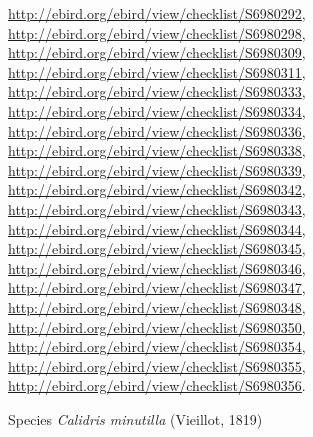 \documentclass[9pt, article]{memoir}
\begin{document}
\begin{multicols}{2}
\url{http://ebird.org/ebird/view/checklist/S6980292}, 
\url{http://ebird.org/ebird/view/checklist/S6980298}, 
\url{http://ebird.org/ebird/view/checklist/S6980309}, 
\url{http://ebird.org/ebird/view/checklist/S6980311}, 
\url{http://ebird.org/ebird/view/checklist/S6980333}, 
\url{http://ebird.org/ebird/view/checklist/S6980334}, 
\url{http://ebird.org/ebird/view/checklist/S6980336}, 
\url{http://ebird.org/ebird/view/checklist/S6980338}, 
\url{http://ebird.org/ebird/view/checklist/S6980339}, 
\url{http://ebird.org/ebird/view/checklist/S6980342}, 
\url{http://ebird.org/ebird/view/checklist/S6980343}, 
\url{http://ebird.org/ebird/view/checklist/S6980344}, 
\url{http://ebird.org/ebird/view/checklist/S6980345}, 
\url{http://ebird.org/ebird/view/checklist/S6980346}, 
\url{http://ebird.org/ebird/view/checklist/S6980347}, 
\url{http://ebird.org/ebird/view/checklist/S6980348}, 
\url{http://ebird.org/ebird/view/checklist/S6980350}, 
\url{http://ebird.org/ebird/view/checklist/S6980354}, 
\url{http://ebird.org/ebird/view/checklist/S6980355}, 
\url{http://ebird.org/ebird/view/checklist/S6980356}.

\vspace{6pt}\noindent\hspace{36pt}Species \textit{Calidris minutilla} (Vieillot, 1819)



\end{multicols}
\end{document}

